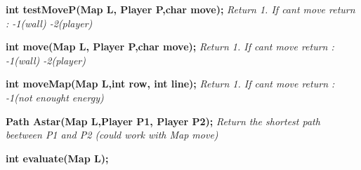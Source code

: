 {\bfseries int test\+Move\+P(\+Map L, Player P,char move);} {\itshape Return 1. If can\textquotesingle{}t move return \+: -\/1(wall) -\/2(player)}

{\bfseries int move(\+Map L, Player P,char move);} {\itshape Return 1. If can\textquotesingle{}t move return \+: -\/1(wall) -\/2(player)}

{\bfseries int move\+Map(\+Map L,int row, int line);} {\itshape Return 1. If can\textquotesingle{}t move return \+: -\/1(not enought energy)}

{\bfseries Path Astar(\+Map L,\+Player P1, Player P2);} {\itshape Return the shortest path beetween P1 and P2 (could work with Map move)}

{\bfseries int evaluate(\+Map L);} 